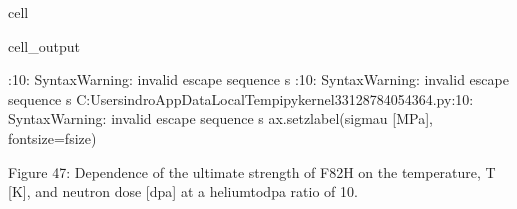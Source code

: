 \documentclass[letterpaper,10pt,english]{jupyterBook}
\begin{document}
\begin{sphinxuseclass}{cell}
\begin{sphinxVerbatimOutput}
			\begin{sphinxuseclass}{cell_output}
				\begin{sphinxVerbatim}[commandchars=\\\{\}]
					\PYGZlt{}\PYGZgt{}:10: SyntaxWarning: invalid escape sequence \PYGZsq{}\PYGZbs{}s\PYGZsq{}
					\PYGZlt{}\PYGZgt{}:10: SyntaxWarning: invalid escape sequence \PYGZsq{}\PYGZbs{}s\PYGZsq{}
					C:\PYGZbs{}Users\PYGZbs{}indro\PYGZbs{}AppData\PYGZbs{}Local\PYGZbs{}Temp\PYGZbs{}ipykernel\PYGZus{}33128\PYGZbs{}784054364.py:10: SyntaxWarning: invalid escape sequence \PYGZsq{}\PYGZbs{}s\PYGZsq{}
					ax.set\PYGZus{}zlabel(\PYGZsq{}\PYGZdl{}\PYGZbs{}sigma\PYGZus{}u\PYGZdl{} [MPa]\PYGZsq{}, fontsize=f\PYGZus{}size)
				\end{sphinxVerbatim}
				
				\noindent{}
				
		\end{sphinxuseclass}\end{sphinxVerbatimOutput}
		
	\end{sphinxuseclass}
	\sphinxAtStartPar
	Figure 47: Dependence of the ultimate strength of F82H on the temperature, T {[}K{]}, and neutron dose {[}dpa{]} at a helium\sphinxhyphen{}to\sphinxhyphen{}dpa ratio of 10.
	
\end{document}
